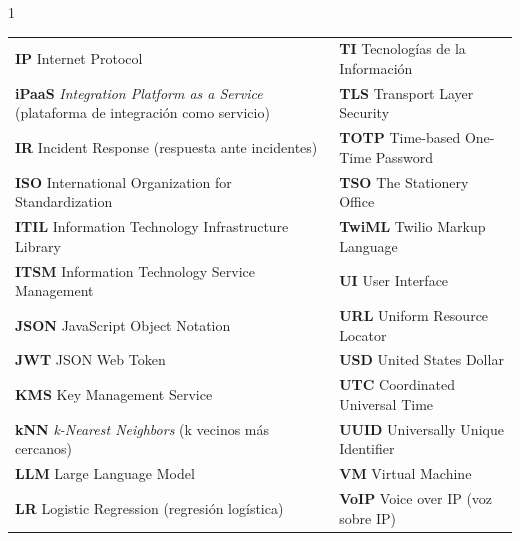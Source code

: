 \begin{spacing}{1}
\begin{tabular}{@{}>{\raggedright\arraybackslash}p{}@{\hspace{0.05\textwidth}}>{\raggedright\arraybackslash}p{}@{}}
\textbf{IP} Internet Protocol & \textbf{TI} Tecnologías de la Información \\
\textbf{iPaaS} \emph{Integration Platform as a Service} (plataforma de integración como servicio) & \textbf{TLS} Transport Layer Security \\
\textbf{IR} Incident Response (respuesta ante incidentes) & \textbf{TOTP} Time-based One-Time Password \\
\textbf{ISO} International Organization for Standardization & \textbf{TSO} The Stationery Office \\
\textbf{ITIL} Information Technology Infrastructure Library & \textbf{TwiML} Twilio Markup Language \\
\textbf{ITSM} Information Technology Service Management & \textbf{UI} User Interface \\
\textbf{JSON} JavaScript Object Notation & \textbf{URL} Uniform Resource Locator \\
\textbf{JWT} JSON Web Token & \textbf{USD} United States Dollar \\
\textbf{KMS} Key Management Service & \textbf{UTC} Coordinated Universal Time \\
\textbf{kNN} \emph{k-Nearest Neighbors} (k vecinos más cercanos) & \textbf{UUID} Universally Unique Identifier \\
\textbf{LLM} Large Language Model & \textbf{VM} Virtual Machine \\
\textbf{LR} Logistic Regression (regresión logística) & \textbf{VoIP} Voice over IP (voz sobre IP) \\
\end{tabular}
\end{spacing}
\newpage

